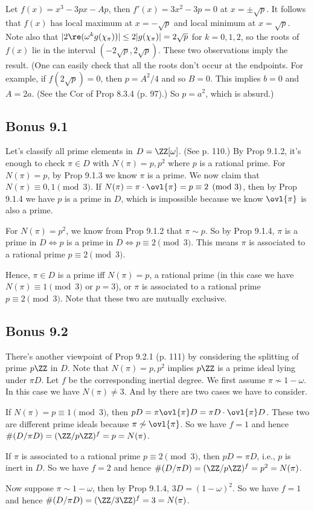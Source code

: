 \documentclass[../Chapter.tex]{subfiles}
\begin{document}
Let $f(x)=x^3-3px-Ap$, then $f'(x)=3x^2-3p=0$ at $x=\pm\sqrt{p}$. It follows that $f(x)$ has local maximum at $x=-\sqrt{p}$ and local minimum at $x=\sqrt{p}$. Note also that $|2\re(\omega^kg(\chi_\pi))|\leq2|g(\chi_\pi)|=2\sqrt{p}$ for $k=0,1,2$, so the roots of $f(x)$ lie in the interval $(-2\sqrt{p},2\sqrt{p})$. These two observations imply the result. (One can easily check that all the roots don't occur at the endpoints. For example, if $f(2\sqrt{p})=0$, then $p=A^2/4$ and so $B=0$. This implies $b=0$ and $A=2a$. (See the Cor of Prop 8.3.4 (p. 97).) So $p=a^2$, which is absurd.)

\subsection*{Bonus 9.1} \label{Bonus 9.1}

Let's classify all prime elements in $D=\ZZ[\omega]$. (See p. 110.) By Prop 9.1.2, it's enough to check $\pi\in D$ with $N(\pi)=p,p^2$ where $p$ is a rational prime. For $N(\pi)=p$, by Prop 9.1.3 we know $\pi$ is a prime. We now claim that $N(\pi)\equiv0,1\pmod{3}$. If $N(\pi)=\pi\cdot\ovl{\pi}=p\equiv2\pmod{3}$, then by Prop 9.1.4 we have $p$ is a prime in $D$, which is impossible because we know $\ovl{\pi}$ is also a prime.

For $N(\pi)=p^2$, we know from Prop 9.1.2 that $\pi\sim p$. So by Prop 9.1.4, $\pi$ is a prime in $D \iff p$ is a prime in $D\iff p\equiv 2\pmod{3}$. This means $\pi$ is associated to a rational prime $p\equiv 2\pmod{3}$.

Hence, $\pi\in D$ is a prime iff $N(\pi)=p$, a rational prime (in this case we have $N(\pi)\equiv1\pmod{3}$ or $p=3$), or $\pi$ is associated to a rational prime $p\equiv 2\pmod{3}$. Note that these two are mutually exclusive.

\subsection*{Bonus 9.2}

There's another viewpoint of Prop 9.2.1 (p. 111) by considering the splitting of prime $p\ZZ$ in $D$. Note that $N(\pi)=p,p^2$ implies $p\ZZ$ is a prime ideal lying under $\pi D$. Let $f$ be the corresponding inertial degree. We first assume $\pi\not\sim1-\omega$. In this case we have $N(\pi)\neq3$. And by  there are two cases we have to consider.

If $N(\pi)=p\equiv1\pmod{3}$, then $pD=\pi\ovl{\pi}D=\pi D\cdot\ovl{\pi}D$. These two are different prime ideals because $\pi\not\sim\ovl{\pi}$. So we have $f=1$ and hence $\#(D/\pi D)=(\ZZ/p\ZZ)^f=p=N(\pi)$.

If $\pi$ is associated to a rational prime $p\equiv 2\pmod{3}$, then $pD=\pi D$, i.e., $p$ is inert in $D$. So we have $f=2$ and hence $\#(D/\pi D)=(\ZZ/p\ZZ)^f=p^2=N(\pi)$.

Now suppose $\pi\sim1-\omega$, then by Prop 9.1.4, $3D=(1-\omega)^2$. So we have $f=1$ and hence $\#(D/\pi D)=(\ZZ/3\ZZ)^f=3=N(\pi)$.
\end{document}
